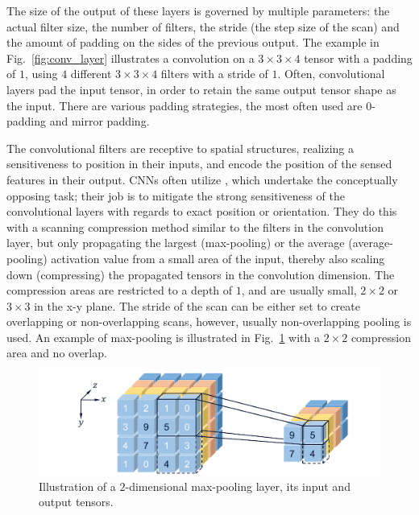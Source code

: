 			The size of the output of these layers is governed by multiple parameters: the actual filter size, the number of filters, the stride (the step size of the scan) and the amount of padding on the sides of the previous output.
			The example in Fig.~\ref{fig:conv_layer} illustrates a convolution on a $3\times3\times4$ tensor with a padding of $1$, using $4$ different $3\times3\times4$ filters with a stride of $1$.
			Often, convolutional layers pad the input tensor, in order to retain the same output tensor shape as the input.
			There are various padding strategies, the most often used are $0$-padding and mirror padding.
		
			The convolutional filters are receptive to spatial structures, realizing a sensitiveness to position in their inputs, and encode the position of the sensed features in their output.
			\acp{CNN} often utilize , which undertake the conceptually opposing task; their job is to mitigate the strong sensitiveness of the convolutional layers with regards to exact position or orientation.
			They do this with a scanning compression method similar to the filters in the convolution layer, but only propagating the largest (max-pooling) or the average (average-pooling) activation value from a small area of the input, thereby also scaling down (compressing) the propagated tensors in the convolution dimension. 
			The compression areas are restricted to a depth of $1$, and are usually small, $2\times2$ or $3\times3$ in the x-y plane.
			The stride of the scan can be either set to create overlapping or non-overlapping scans, however, usually non-overlapping pooling is used.
			An example of max-pooling is illustrated in Fig.~\ref{fig:pooling_layer} with a $2\times2$ compression area and no overlap.
			
			\begin{figure}[ht]
				\centering
				\includegraphics[width=0.8\linewidth]{figures/02_deep_learning/pooling_layer/pooling_layer.pdf}
				\caption[Max-pooling layer]{Illustration of a $2$-dimensional max-pooling layer, its input and output tensors.}
				\label{fig:pooling_layer}
			\end{figure}
			

